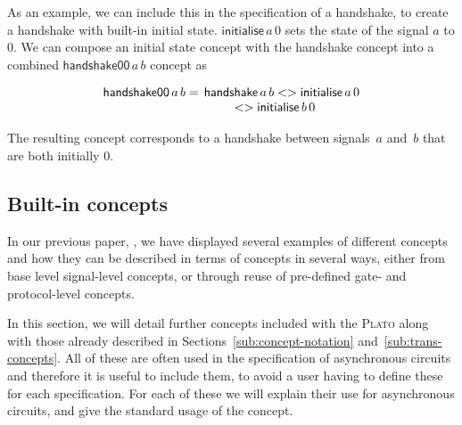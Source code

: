 \documentclass[british,conference,compsoc]{IEEEtran}
\newcommand{\noun}[1]{\textsc{#1}}
\begin{document}
\noindent As an example, we can include this in the specification of a 
handshake, to create a handshake with built-in initial state.
$\mathsf{initialise}\,a\, 0$ sets the state of the signal
$a$ to $0$. We can compose an initial state concept with the handshake concept
into a combined $\mathsf{handshake00}\,a\, b$ concept as

\vspace{-3mm}

\[
\begin{array}{lcl}
\mathsf{handshake00}\, a\, b =&\hspace{-2mm}\mathsf{handshake}\,a\, b 
	<> \mathsf{initialise}\,a\, 0 \\
&\hspace{-6mm}<> \mathsf{initialise}\,b\, 0
\end{array}
\]

\vspace{-1mm}

The resulting concept corresponds to a handshake between signals~$a$
and~$b$ that are both initially $0$.

\vspace{-2mm}

\subsection{Built-in concepts \label{sub:built-in}}

\vspace{-3mm}

In our previous paper, \cite{2015_Beaumont_MEMOCODE}, we have displayed several
examples of different concepts and how they can be described in terms of 
concepts in several ways, either from base level signal-level concepts, or 
through reuse of pre-defined gate- and protocol-level concepts.

In this section, we will detail further concepts included with the \noun{Plato}
along with those already described in Sections~\ref{sub:concept-notation} 
and~\ref{sub:trans-concepts}. All of these are often used in the specification 
of asynchronous circuits and therefore it is useful to include them, to avoid a 
user having to define these for each specification. For each of these we will 
explain their use for asynchronous circuits, and give the standard usage of the 
concept. 
\end{document}

